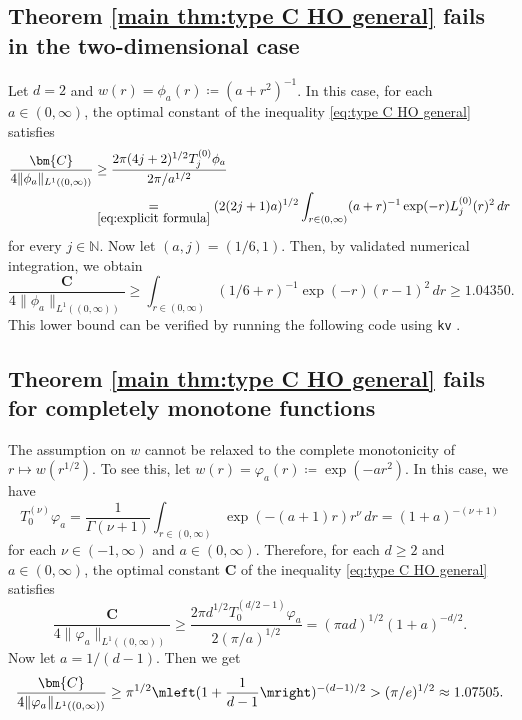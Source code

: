\documentclass[reqno]{amsart}
\theoremstyle{plain}
\numberwithin{equation}{section}
\theoremstyle{remark}
\newcommand{\N}{\mathbb{N}}
\newcommand{\intervaloo}[2]{(#1, #2)}
\newcommand{\norm}[1]{\lVert#1\rVert}
\newcommand{\Tjnuf}[3]{T_{#1}^{(#2)}#3}
\newcommand{\Const}{\bm{C}}
\newcommand{\LaguerreL}[2]{L_{#1}^{(#2)}}
\newcommand{\gaussian}{\varphi}
\newcommand{\gaussiana}[1]{\gaussian_{#1}}
\newcommand{\weightphia}[1]{\phi_{#1}}
\begin{document}
\subsection{Theorem \ref{main thm:type C HO general} fails in the two-dimensional case} \label{section:fails in 2D}
Let $d=2$ and $w(r) = \weightphia{a}(r) \coloneqq (a + r^2)^{-1}$.
In this case, for each $a \in \intervaloo{0}{\infty}$, the optimal constant of the inequality \eqref{eq:type C HO general} satisfies
\begin{align}
	\frac{\Const}{4 \norm{\weightphia{a}}_{L^1(\intervaloo{0}{\infty})}} 
	&\geq \frac{2 \pi (4j+2)^{1/2} \Tjnuf{j}{0}{\weightphia{a}}}{2 \pi / a^{1/2}} \\
	&\underset{\eqref{eq:explicit formula}}{=} (2 (2j+1) a)^{1/2} \int_{r \in \intervaloo{0}{\infty}} (a+r)^{-1} \exp(-r) \LaguerreL{j}{0}(r)^2 \, dr
\end{align}
for every $j \in \N$.
Now let $(a, j) = (1/6, 1)$. Then, by validated numerical integration, we obtain
\begin{equation}
	\frac{\Const}{4 \norm{\weightphia{a}}_{L^1(\intervaloo{0}{\infty})}} \geq \int_{r \in \intervaloo{0}{\infty}} (1/6+r)^{-1} \exp(-r) (r-1)^2 \, dr \geq 1.04350 .
\end{equation}
This lower bound can be verified by running the following code using
\texttt{kv} \cite{kv}.

\subsection{Theorem \ref{main thm:type C HO general} fails for completely monotone functions} \label{section:fails for cm}
The assumption on $w$ cannot be relaxed to the complete monotonicity of $r \longmapsto w(r^{1/2})$.
To see this, let $w(r) = \gaussiana{a}(r) \coloneqq \exp(-a r^2)$.
In this case, we have
\begin{equation}
	\Tjnuf{0}{\nu}{\gaussiana{a}}
	= \frac{1}{\Gamma(\nu+1)} \int_{r \in \intervaloo{0}{\infty}} \exp(- (a+1) r) r^{\nu} \, dr
= (1+a)^{-(\nu+1)}
\end{equation}
for each $\nu \in \intervaloo{-1}{\infty}$ and $a \in \intervaloo{0}{\infty}$.
Therefore, for each $d \geq 2$ and $a \in \intervaloo{0}{\infty}$, the optimal constant $\Const$ of the inequality \eqref{eq:type C HO general} satisfies
\begin{equation}
\frac{\Const}{4 \norm{\gaussiana{a}}_{L^1(\intervaloo{0}{\infty})}} \geq \frac{2 \pi d^{1/2} \Tjnuf{0}{d/2 - 1}{\gaussiana{a}}}{2 (\pi / a)^{1/2}} = (\pi a d)^{1/2} (1+a)^{-d/2} .
\end{equation}
Now let $a = 1/(d-1)$. Then we get
\begin{equation}
\frac{\Const}{4 \norm{\gaussiana{a}}_{L^1(\intervaloo{0}{\infty})}} \geq \pi^{1/2} \mleft( 1 + \frac{1}{d-1} \mright)^{-(d-1)/2} > (\pi / e)^{1/2} \approx 1.07505 .
\end{equation}

\end{document}
